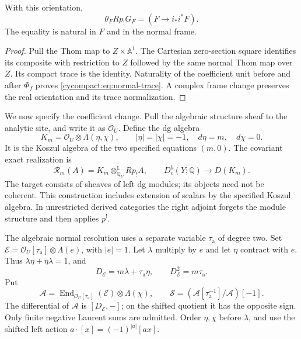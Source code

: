 \begin{lemma}\label{cycompact:lem:normal-trace}
With this orientation,
\begin{equation}\label{cycompact:eq:normal-trace}
 \theta_F Rp_!G_F=(F\longrightarrow i_*i^*F).
\end{equation}
The equality is natural in $F$ and in the normal frame.
\end{lemma}

\begin{proof}
Pull the Thom map to $Z\times\mathbb A^1$.
The Cartesian zero-section square identifies its
composite with restriction to $Z$ followed by the
same normal Thom map over $Z$. Its compact trace is
the identity. Naturality of the coefficient unit
before and after $\Phi_f$ proves
\eqref{cycompact:eq:normal-trace}. A complex frame
change preserves the real orientation and its
trace normalization.
\end{proof}

We now specify the coefficient change. Pull the
algebraic structure sheaf to the analytic site,
and write it as $\mathscr O_U$. Define the dg algebra
\begin{equation}\label{cycompact:eq:normal-Koszul}
 K_m=\mathscr O_U\otimes\Lambda(\eta,\chi),\qquad
 |\eta|=|\chi|=-1,\quad d\eta=m,\quad d\chi=0.
\end{equation}
It is the Koszul algebra of the two specified
equations $(m,0)$. The covariant exact realization is
\begin{equation}\label{cycompact:eq:normal-realization}
 \mathcal R_m(A)=K_m\otimes_{\mathbb Q_U}^{\mathbb L}Rp_!A,
 \qquad D_c^b(Y;\mathbb Q)\longrightarrow D(K_m).
\end{equation}
The target consists of sheaves of left dg modules;
its objects need not be coherent. This construction
includes extension of scalars by the specified
Koszul algebra. In unrestricted derived categories
the right adjoint forgets the module structure and
then applies $p^!$.

The algebraic normal resolution uses a separate
variable $\tau_{\mathrm a}$ of degree two. Set
$\mathcal E=\mathscr O_U[\tau_{\mathrm a}]\otimes\Lambda(e)$,
with $|e|=1$. Let $\lambda$ multiply by $e$ and
let $\eta$ contract with $e$. Thus
$\lambda\eta+\eta\lambda=1$, and
\[
 D_{\mathcal E}=m\lambda+\tau_{\mathrm a}\eta,
 \qquad D_{\mathcal E}^2=m\tau_{\mathrm a}.
\]
Put
\[
 \mathscr A=\operatorname{End}_{\mathscr O_U[\tau_{\mathrm a}]}
       (\mathcal E)\otimes\Lambda(\chi),\qquad
 \mathscr S=(\mathscr A[\tau_{\mathrm a}^{-1}]/\mathscr A)[-1].
\]
The differential of $\mathscr A$ is $[D_{\mathcal E},-]$;
on the shifted quotient it has the opposite sign.
Only finite negative Laurent sums are admitted.
Order $\eta,\chi$ before $\lambda$, and use the shifted
left action $a\cdot[x]=(-1)^{|a|}[ax]$.

